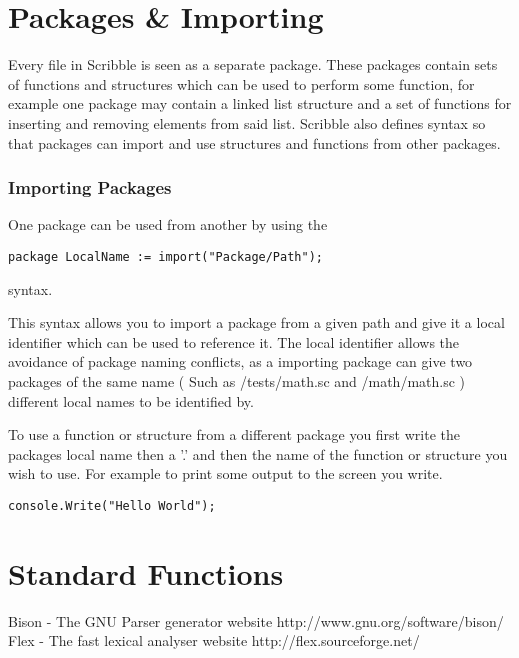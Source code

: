 \documentclass[]{final_report}
\begin{document}
\chapter{Packages \& Importing}

Every file in Scribble is seen as a separate package. These packages contain sets of functions and structures which can be used to perform some function, for example one package may contain a linked list structure and a set of functions for inserting and removing elements from said list. Scribble also defines syntax so that packages can import and use structures and functions from other packages.

\subsection{Importing Packages}

One package can be used from another by using the
\begin{verbatim}
package LocalName := import("Package/Path");
\end{verbatim}
syntax.

This syntax allows you to import a package from a given path and give it a local identifier which can be used to reference it. The local identifier allows the avoidance of package naming conflicts, as a importing package can give two packages of the same name ( Such as /tests/math.sc and /math/math.sc ) different local names to be identified by.

To use a function or structure from a different package you first write the packages local name then a '.' and then the name of the function or structure you wish to use. For example to print some output to the screen you write.

\begin{verbatim}
console.Write("Hello World");
\end{verbatim}


\chapter{Standard Functions}

\newpage
\begin{thebibliography}{99}
 Bison - The GNU Parser generator website http://www.gnu.org/software/bison/
 Flex - The fast lexical analyser website http://flex.sourceforge.net/
\end{thebibliography}
\label{endpage}
\end{document}
